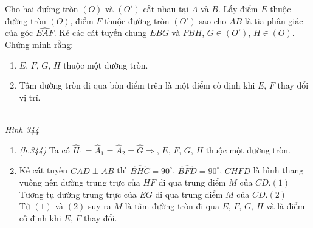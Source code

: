 \begin{bt}
 Cho hai đường tròn $(O)$ và $(O')$ cắt nhau tại $A$ và $B$. Lấy điểm $E$ thuộc đường tròn $(O)$, điểm $F$ thuộc đường tròn $(O')$ sao cho $AB$ là tia phân giác của góc $\widehat{EAF}$. Kẻ các cát tuyến chung $EBG$ và $FBH$, $G\in(O')$, $H\in(O)$. Chứng minh rằng:
 \begin{enumerate}
  \item $E$, $F$, $G$, $H$ thuộc một đường tròn.
  \item Tâm đường tròn đi qua bốn điểm trên là một điểm cố định khi $E$, $F$ thay đổi vị trí.
 \end{enumerate}
 \loigiai
  {
  \begin{center}
   \\
  \textit{Hình 344}
  \end{center}
  \begin{enumerate}
	\item \textit{(h.344)} Ta có $\widehat{H}_1=\widehat{A}_1=\widehat{A}_2=\widehat{G}\Rightarrow$, $E$, $F$, $G$, $H$ thuộc một đường tròn.
	\item Kẻ cát tuyến $CAD\perp AB$ thì $\widehat{BHC}=90^\circ$, $\widehat{BFD}=90^\circ$, $CHFD$ là hình thang vuông nên đường trung trực của $HF$ đi qua trung điểm $M$ của $CD$.\hfill$(1)$\\
	Tương tụ đường trung trực của $EG$ đi qua trung điểm $M$ của $CD$.\hfill$(2)$\\
	Từ $(1)$ và $(2)$ suy ra $M$ là tâm đường tròn đi qua $E$, $F$, $G$, $H$ và là điểm cố định khi $E$, $F$ thay đổi.
  \end{enumerate}
  }
\end{bt}
 
